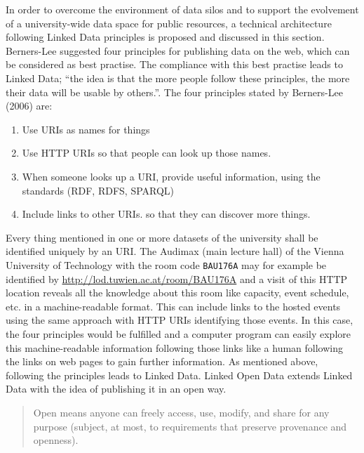 \documentclass{article}
\begin{document}
In order to overcome the environment of data silos and to support the evolvement of a university-wide data space for public resources, a technical architecture following Linked Data principles is proposed and discussed in this section. Berners-Lee suggested four principles for publishing data on the web, which can be considered as best practise. The compliance with this best practise leads to Linked Data; \enquote{the idea is that the more people follow these principles, the more their data will be usable by others.}\cite{simperl_using_2013}. The four principles stated by Berners-Lee (2006)\cite{berners-lee_linked_2006} are:
\begin{enumerate}
	\item Use URIs as names for things
	\item Use HTTP URIs so that people can look up those names.
	\item When someone looks up a URI, provide useful information, using the standards (RDF, RDFS, SPARQL)
	\item Include links to other URIs. so that they can discover more things.
\end{enumerate}
Every thing mentioned in one or more datasets of the university shall be identified uniquely by an URI. The Audimax (main lecture hall) of the Vienna University of Technology with the room code \texttt{BAU176A} may for example be identified by \url{http://lod.tuwien.ac.at/room/BAU176A} and a visit of this HTTP location reveals all the knowledge about this room like capacity, event schedule, etc. in a machine-readable format. This can include links to the hosted events using the same approach with HTTP URIs identifying those events. In this case, the four principles would be fulfilled and a computer program can easily explore this machine-readable information following those links like a human following the links on web pages to gain further information. As mentioned above, following the principles leads to Linked Data. Linked Open Data extends Linked Data with the idea of publishing it in an open way.
\begin{quote} Open means anyone can freely access, use, modify, and share for any purpose (subject, at most, to requirements that preserve provenance and openness).\cite{_open_????}\end{quote}
\end{document}
